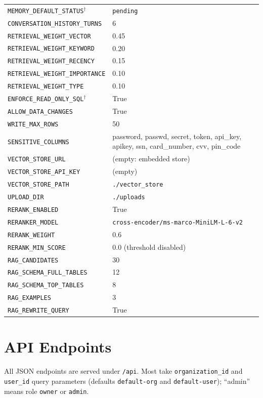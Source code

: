 \begin{longtable}{p{7.2cm} p{7.6cm}}
    \texttt{MEMORY\_DEFAULT\_STATUS}$^\dagger$ & \texttt{pending} \\
    \texttt{CONVERSATION\_HISTORY\_TURNS}   & 6 \\
    \texttt{RETRIEVAL\_WEIGHT\_VECTOR}      & 0.45 \\
    \texttt{RETRIEVAL\_WEIGHT\_KEYWORD}     & 0.20 \\
    \texttt{RETRIEVAL\_WEIGHT\_RECENCY}     & 0.15 \\
    \texttt{RETRIEVAL\_WEIGHT\_IMPORTANCE}  & 0.10 \\
    \texttt{RETRIEVAL\_WEIGHT\_TYPE}        & 0.10 \\
    \texttt{ENFORCE\_READ\_ONLY\_SQL}$^\dagger$ & True \\
    \texttt{ALLOW\_DATA\_CHANGES}           & True \\
    \texttt{WRITE\_MAX\_ROWS}               & 50 \\
    \texttt{SENSITIVE\_COLUMNS}             & password, passwd, secret, token, api\_key, apikey, ssn, card\_number, cvv, pin\_code \\
    \texttt{VECTOR\_STORE\_URL}             & (empty: embedded store) \\
    \texttt{VECTOR\_STORE\_API\_KEY}        & (empty) \\
    \texttt{VECTOR\_STORE\_PATH}            & \texttt{./vector\_store} \\
    \texttt{UPLOAD\_DIR}                    & \texttt{./uploads} \\
    \texttt{RERANK\_ENABLED}                & True \\
    \texttt{RERANKER\_MODEL}                & \texttt{cross-encoder/ms-marco-MiniLM-L-6-v2} \\
    \texttt{RERANK\_WEIGHT}                 & 0.6 \\
    \texttt{RERANK\_MIN\_SCORE}             & 0.0 (threshold disabled) \\
    \texttt{RAG\_CANDIDATES}                & 30 \\
    \texttt{RAG\_SCHEMA\_FULL\_TABLES}      & 12 \\
    \texttt{RAG\_SCHEMA\_TOP\_TABLES}       & 8 \\
    \texttt{RAG\_EXAMPLES}                  & 3 \\
    \texttt{RAG\_REWRITE\_QUERY}            & True \\
    \bottomrule
\end{longtable}
\endgroup

\section{API Endpoints}
\label{app:api}
All JSON endpoints are served under \texttt{/api}. Most take \texttt{organization\_id} and
\texttt{user\_id} query parameters (defaults \texttt{default-org} and \texttt{default-user});
``admin'' means role \texttt{owner} or \texttt{admin}.

